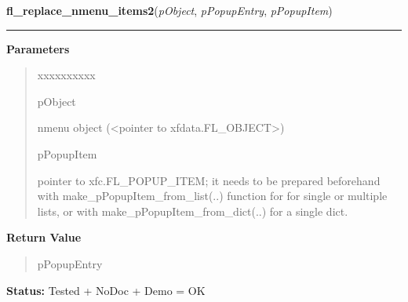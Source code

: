 \hspace{.8\funcindent}\begin{boxedminipage}{\funcwidth}

    \raggedright \textbf{fl\_replace\_nmenu\_items2}(\textit{pObject}, \textit{pPopupEntry}, \textit{pPopupItem})

    \vspace{-1.5ex}

    \rule{\textwidth}{0.5\fboxrule}
\setlength{\parskip}{2ex}
\setlength{\parskip}{1ex}
      \textbf{Parameters}
      \vspace{-1ex}

      \begin{quote}
        \begin{Ventry}{xxxxxxxxxx}

          \item[pObject]

          nmenu object ({\textless}pointer to 
          xfdata.FL\_OBJECT{\textgreater})

          \item[pPopupItem]

          pointer to xfc.FL\_POPUP\_ITEM; it needs to be prepared 
          beforehand with make\_pPopupItem\_from\_list(..) function for for
          single or multiple lists, or with 
          make\_pPopupItem\_from\_dict(..) for a single dict.

        \end{Ventry}

      \end{quote}

      \textbf{Return Value}
    \vspace{-1ex}

      \begin{quote}
      pPopupEntry

      \end{quote}

\textbf{Status:} Tested + NoDoc + Demo = OK



    \end{boxedminipage}

    \label{xformslib:library:fl_get_nmenu_popup}

    \vspace{0.5ex}

